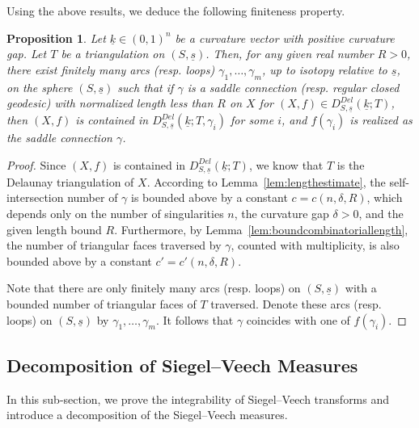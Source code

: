 \documentclass{compositio}
\numberwithin{equation}{section}
\numberwithin{figure}{section}
\theoremstyle{definition}
\theoremstyle{plain}
\newtheorem{proposition}[definition]{Proposition}
\begin{document}
{Using the above results, we deduce the following finiteness property.
\begin{proposition}\label{prop:finiteboundedlengthgeodesics}
    Let $\underline{k}\in (0, 1)^n$ be a curvature vector with positive curvature gap. Let $T$ be a triangulation on $(S,\underline{s})$. Then, for any given real number $R > 0$, there exist finitely many arcs (resp. loops) $\gamma_1, \ldots, \gamma_m$, up to isotopy relative to $\underline{s}$, on the sphere $(S, \underline{s})$ such that if $\gamma$ is a saddle connection (resp. regular closed geodesic) with normalized length less than $R$ on $X$ for $(X, f) \in D_{S,\underline{s}}^{Del}(\underline{k};T)$, then $(X, f)$ is contained in $D_{S,\underline{s}}^{Del}(\underline{k};T, \gamma_i)$ for some $i$, and $f(\gamma_i)$ is realized as the saddle connection $\gamma$.
\end{proposition}

\begin{proof}
Since $(X, f)$ is contained in $D_{S,\underline{s}}^{Del}(\underline{k};T)$, we know that $T$ is the Delaunay triangulation of $X$. According to Lemma~\ref{lem:lengthestimate}, the self-intersection number of $\gamma$ is bounded above by a constant $c = c(n, \delta, R)$, which depends only on the number of singularities $n$, the curvature gap $\delta > 0$, and the given length bound $R$. Furthermore, by Lemma~\ref{lem:boundcombinatoriallength}, the number of triangular faces traversed by $\gamma$, counted with multiplicity, is also bounded above by a constant $c' =c'(n, \delta, R)$.

Note that there are only finitely many arcs (resp. loops) on $(S, \underline{s})$ with a bounded number of triangular faces of $T$ traversed. Denote these arcs (resp. loops) on $(S, \underline{s})$ by $\gamma_1, \ldots, \gamma_m$. It follows that $\gamma$ coincides with one of $f(\gamma_i)$.
\end{proof}

\subsection{Decomposition of Siegel--Veech Measures}\label{sec:decompofSV}

In this sub-section, we prove the integrability of Siegel--Veech transforms and introduce a decomposition of the Siegel--Veech measures.

}
\end{document}
